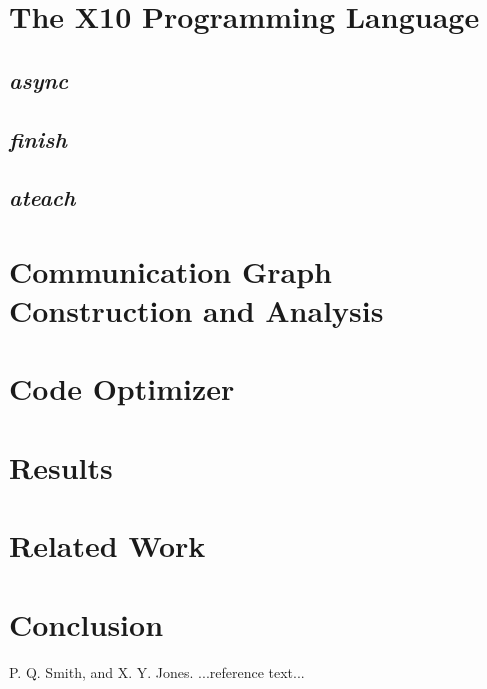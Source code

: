 \documentclass[preprint]{sigplanconf}
\begin{document}
\section{The X10 Programming Language}
\subsection{\emph{async}}
\subsection{\emph{finish}}
\subsection{\emph{ateach}}
\section{Communication Graph Construction and Analysis}
\section{Code Optimizer}
\section{Results}
\section{Related Work}
\section{Conclusion}








\begin{thebibliography}{}
\softraggedright

P. Q. Smith, and X. Y. Jones. ...reference text...

\end{thebibliography}
\end{document}
